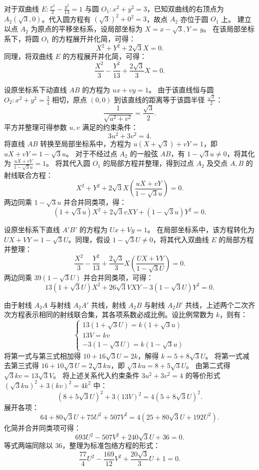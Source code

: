 \begin{solution}
对于双曲线 $E: \frac{x^2}{3} - \frac{y^2}{13} = 1$ 与圆 $O_1: x^2 + y^2 = 3$，已知双曲线的右顶点为 $A_2(\sqrt{3}, 0)$。代入圆方程有 $(\sqrt3)^2+0^2=3$，故点 $A_2$ 亦位于圆 $O_1$ 上。
建立以点 $A_2$ 为原点的平移坐标系，设局部坐标为 $X = x - \sqrt{3}, Y = y$。
在该局部坐标系下，将圆 $O_1$ 的方程展开并化简，可得：
\[ X^2 + Y^2 + 2\sqrt{3}X = 0. \]
同理，将双曲线 $E$ 的方程展开并化简，可得：
\[ \frac{X^2}{3} - \frac{Y^2}{13} + \frac{2\sqrt{3}}{3}X = 0. \]

设原坐标系下动直线 $AB$ 的方程为 $ux + vy = 1$。
由于该直线恒与圆 $O_2: x^2 + y^2 = \frac{3}{4}$ 相切，原点 $(0,0)$ 到该直线的距离等于该圆半径 $\frac{\sqrt{3}}{2}$：
\[ \frac{1}{\sqrt{u^2 + v^2}} = \frac{\sqrt{3}}{2}. \]
平方并整理可得参数 $u, v$ 满足的约束条件：
\[ 3u^2 + 3v^2 = 4. \]
将直线 $AB$ 转换至局部坐标系中，方程为 $u(X+\sqrt{3}) + vY = 1$，即 $uX + vY = 1 - \sqrt{3}u$。
对于不经过点 $A_2$ 的一般弦 $AB$，有 $1 - \sqrt{3}u \neq 0$，将其化为 $\frac{uX + vY}{1-\sqrt{3}u} = 1$。
将其代入圆 $O_1$ 的局部方程并整理，得到过点 $A_2$ 及交点 $A, B$ 的射线联合方程：
\[ X^2 + Y^2 + 2\sqrt{3}X \left( \frac{uX + vY}{1-\sqrt{3}u} \right) = 0. \]
两边同乘 $1 - \sqrt{3}u$ 并合并同类项，得：
\[ (1 + \sqrt{3}u)X^2 + 2\sqrt{3}v XY + (1 - \sqrt{3}u)Y^2 = 0. \]

设原坐标系下直线 $A'B'$ 的方程为 $Ux + Vy = 1$。
在局部坐标系中，该方程转化为 $UX + VY = 1 - \sqrt{3}U$。同理，假设 $1 - \sqrt{3}U \neq 0$，将其代入双曲线 $E$ 的局部方程并整理：
\[ \frac{X^2}{3} - \frac{Y^2}{13} + \frac{2\sqrt{3}}{3}X \left( \frac{UX + VY}{1-\sqrt{3}U} \right) = 0. \]
两边同乘 $39(1 - \sqrt{3}U)$ 并合并同类项，可得：
\[ 13(1 + \sqrt{3}U)X^2 + 26\sqrt{3}V XY - 3(1 - \sqrt{3}U)Y^2 = 0. \]

由于射线 $A_2A$ 与射线 $A_2A'$ 共线，射线 $A_2B$ 与射线 $A_2B'$ 共线，上述两个二次齐次方程表示相同的射线联合集，其各项系数必成比例。设比例常数为 $k$，则有：
\[ \begin{cases} 13(1 + \sqrt{3}U) = k(1 + \sqrt{3}u) \\ 13V = kv \\ -3(1 - \sqrt{3}U) = k(1 - \sqrt{3}u) \end{cases} \]
将第一式与第三式相加得 $10 + 16\sqrt{3}U = 2k$，解得 $k = 5 + 8\sqrt{3}U$。
将第一式减去第三式得 $16 + 10\sqrt{3}U = 2\sqrt{3}ku$，即 $\sqrt{3}ku = 8 + 5\sqrt{3}U$。
由第二式得 $\sqrt{3}kv = 13\sqrt{3}V$。
将上述关系代入约束条件 $3u^2 + 3v^2 = 4$ 的等价形式 $(\sqrt{3}ku)^2 + 3(kv)^2 = 4k^2$ 中：
\[ (8 + 5\sqrt{3}U)^2 + 3(13V)^2 = 4(5 + 8\sqrt{3}U)^2. \]
展开各项：
\[ 64 + 80\sqrt{3}U + 75U^2 + 507V^2 = 4(25 + 80\sqrt{3}U + 192U^2). \]
化简并合并同类项可得：
\[ 693U^2 - 507V^2 + 240\sqrt{3}U + 36 = 0. \]
等式两端同除以 $36$，整理为标准包络方程的形式：
\[ \frac{77}{4}U^2 - \frac{169}{12}V^2 + \frac{20\sqrt{3}}{3}U + 1 = 0. \]


\end{solution}
